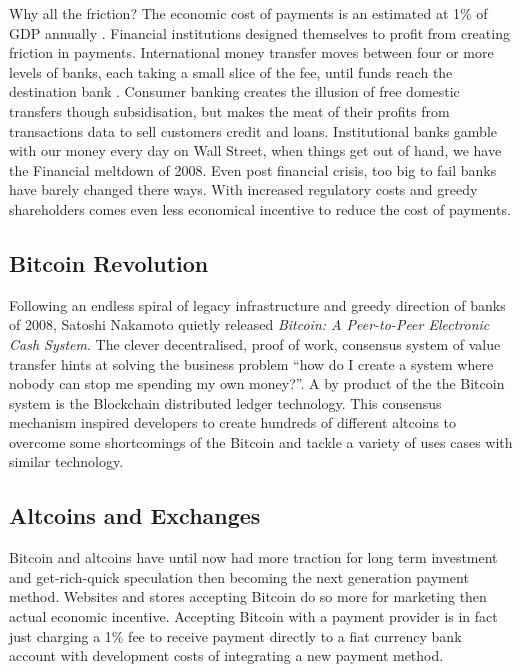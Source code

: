 \documentclass[12pt]{article} %
\begin{document}
Why all the friction? The economic cost of payments is an estimated at 1\% of GDP annually \cite{kaarmann2013cost}. Financial institutions designed themselves to profit from creating friction in payments. International money transfer moves between four or more levels of banks, each taking a small slice of the fee, until funds reach the destination bank . Consumer banking creates the illusion of free domestic transfers though subsidisation, but makes the meat of their profits from transactions data to sell customers credit and loans.  Institutional banks gamble with our money every day on Wall Street, when things get out of hand, we have the Financial meltdown of 2008. Even post financial crisis, too big to fail banks have barely changed there ways. With increased regulatory costs and greedy shareholders comes even less economical incentive to reduce the cost of payments.

\subsection{Bitcoin Revolution}
Following an endless spiral of legacy infrastructure and greedy direction of banks of 2008, Satoshi Nakamoto quietly released \textit{Bitcoin: A Peer-to-Peer Electronic Cash System}\cite{nakamoto2008bitcoin}. The clever decentralised, proof of work, consensus system of value transfer hints at solving the business problem ``how do I create a system where nobody can stop me spending my own money?''\cite{brown2016introducing}. A by product of the the Bitcoin system is the Blockchain distributed ledger technology. This consensus mechanism inspired developers to create hundreds of different altcoins to overcome some shortcomings of the Bitcoin and tackle a variety of uses cases with similar technology.

\subsection{Altcoins and Exchanges}
Bitcoin and altcoins have until now had more traction for long term investment and get-rich-quick speculation then becoming the next generation payment method. Websites and stores accepting Bitcoin do so more for marketing then actual economic incentive. Accepting Bitcoin with a payment provider is in fact just charging a 1\% fee to receive payment directly to a fiat currency bank account with development costs of integrating a new payment method.
\end{document}
